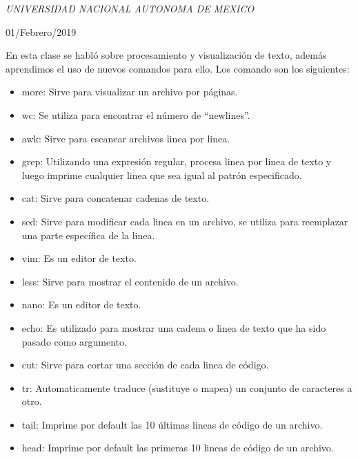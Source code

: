 \documentclass[a4paper, 11pt, oneside]{article}
\begin{document}
\begin{titlepage}
	\textit{UNIVERSIDAD NACIONAL AUTONOMA DE MEXICO} 
	
	\vfill
	
	
	
	
	\vspace{0.3\baselineskip} 
	
	01/Febrero/2019 
	
	 

\end{titlepage}
En esta clase se habló sobre procesamiento y visualización de texto, además aprendimos el uso de nuevos comandos para ello. Los comando son los siguientes:

\begin{itemize}
 \item more: Sirve para visualizar un archivo por páginas.
 \item wc: Se utiliza para encontrar el número de ``newlines''.
 \item awk: Sirve para escanear archivos linea por linea.
 \item grep: Utilizando una expresión regular, procesa linea por linea de texto y luego imprime cualquier linea que sea igual al patrón especificado.
 \item cat: Sirve para concatenar cadenas de texto.
 \item sed: Sirve para modificar cada linea en un archivo, se utiliza para reemplazar una parte específica de la linea.
 \item vim: Es un editor de texto.
 \item less: Sirve para mostrar el contenido de un archivo.
 \item nano: Es un editor de texto.
 \item echo: Es utilizado para mostrar una cadena o linea de texto que ha sido pasado como argumento.
 \item cut: Sirve para cortar una sección de cada linea de código.
 \item tr: Automaticamente traduce (sustituye o mapea) un conjunto de caracteres a otro.
 \item tail: Imprime por default las 10 últimas lineas de código de un archivo.
 \item head: Imprime por default las primeras 10 lineas de código de un archivo.
\end{itemize}
\end{document}
